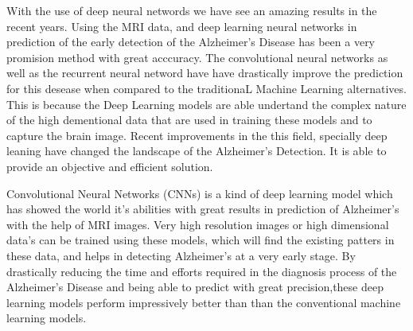 \documentclass[12pt,twocolumn]{report}
\begin{document}
With the use of deep neural networds we have see an amazing results in the recent years. Using the MRI data, and deep learning neural networks in prediction of the early detection of the Alzheimer’s Disease has been a very promision method with great acccuracy. The convolutional neural networks as well as the recurrent neural netword have have drastically improve the prediction for this desease when compared to the traditionaL Machine Learning alternatives. This is because the Deep Learning models are able undertand the complex nature of the high dementional data that are used in training these models and to capture the brain image\cite{2019Jo}. Recent improvements in the this field, specially deep leaning have changed the landscape of the Alzheimer’s Detection. It is able to provide an objective and efficient solution.

Convolutional Neural Networks (CNNs) is a kind of deep learning model which has showed the world it's abilities with great results in prediction of Alzheimer’s with the help of MRI images. Very high resolution images or high dimensional data's can be trained using these models, which will find the existing patters in these data, and helps in detecting Alzheimer’s at a very early stage. By drastically reducing the time and efforts required in the diagnosis process of the Alzheimer’s Disease and being able to predict with great precision,these deep learning models perform impressively better than than the conventional machine learning models.
\end{document}

